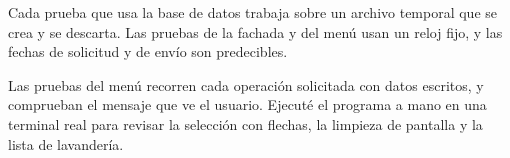 Cada prueba que usa la base de datos trabaja sobre un archivo temporal que se crea y se descarta. Las pruebas de la fachada y del menú usan un reloj fijo, y las fechas de solicitud y de envío son predecibles.

Las pruebas del menú recorren cada operación solicitada con datos escritos, y comprueban el mensaje que ve el usuario. Ejecuté el programa a mano en una terminal real para revisar la selección con flechas, la limpieza de pantalla y la lista de lavandería.

